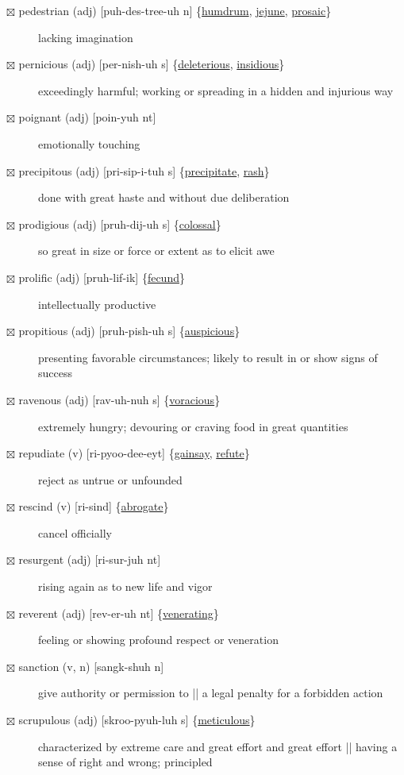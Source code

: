 \documentclass[11pt]{article}
\begin{document}
\begin{description}
\item[{$\boxtimes$ \label{org78dd6a1}pedestrian (adj) [puh-des-tree-uh n] \{\hyperref[org896fd35]{humdrum}, \hyperref[org2d80182]{jejune}, \hyperref[orgb8ddd33]{prosaic}\}}] lacking imagination
\item[{$\boxtimes$ \label{org5e79379}pernicious (adj) [per-nish-uh s] \{\hyperref[org91e2062]{deleterious}, \hyperref[orgdb9cb07]{insidious}\}}] exceedingly harmful; working or spreading in a hidden and injurious way
\item[{$\boxtimes$ poignant (adj) [poin-yuh nt]}] emotionally touching
\item[{$\boxtimes$ \label{orgf789f07}precipitous (adj) [pri-sip-i-tuh s] \{\hyperref[orgb014b69]{precipitate}, \hyperref[orgdaf3ff6]{rash}\}}] done with great haste and without due deliberation
\item[{$\boxtimes$ \label{org3dbdf94}prodigious (adj) [pruh-dij-uh s] \{\hyperref[orgfa4dfe8]{colossal}\}}] so great in size or force or extent as to elicit awe
\item[{$\boxtimes$ \label{orgce9c525}prolific (adj) [pruh-lif-ik] \{\hyperref[orge9e4654]{fecund}\}}] intellectually productive
\item[{$\boxtimes$ \label{orgf063ff6}propitious (adj) [pruh-pish-uh s] \{\hyperref[orgd0e8f52]{auspicious}\}}] presenting favorable circumstances; likely to result in or show signs of success
\item[{$\boxtimes$ \label{orgf195d90}ravenous (adj) [rav-uh-nuh s] \{\hyperref[org96629dc]{voracious}\}}] extremely hungry; devouring or craving food in great quantities
\item[{$\boxtimes$ \label{org1211120}repudiate (v) [ri-pyoo-dee-eyt] \{\hyperref[orgc771101]{gainsay}, \hyperref[org0b4ccdf]{refute}\}}] reject as untrue or unfounded
\item[{$\boxtimes$ \label{orgdafbe24}rescind (v) [ri-sind] \{\hyperref[org72c5c48]{abrogate}\}}] cancel officially
\item[{$\boxtimes$ resurgent (adj) [ri-sur-juh nt]}] rising again as to new life and vigor
\item[{$\boxtimes$ \label{org5bfd879} \label{orgba4443c}reverent (adj) [rev-er-uh nt] \{\hyperref[org4db2461]{venerating}\}}] feeling or showing profound respect or veneration
\item[{$\boxtimes$ sanction (v, n) [sangk-shuh n]}] give authority or permission to || a legal penalty for a forbidden action
\item[{$\boxtimes$ \label{org0389c61}scrupulous (adj) [skroo-pyuh-luh s] \{\hyperref[org2af80b4]{meticulous}\}}] characterized by extreme care and great effort and great effort || having a sense of right and wrong; principled

\end{description}
\end{document}
